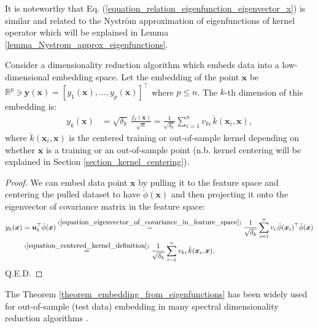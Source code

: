 \documentclass[lang=cn,10pt]{gorgeousnbook}
\numberwithin{equation}{section}%
\numberwithin{figure}{section}%
\begin{document}
It is noteworthy that Eq. (\ref{equation_relation_eigenfunction_eigenvector_x}) is similar and related to the Nystr{\"o}m approximation of eigenfunctions of kernel operator which will be explained in Lemma \ref{lemma_Nystrom_approx_eigenfunctions}.



\begin{theorem}\label{theorem_embedding_from_eigenfunctions}
Consider a dimensionality reduction algorithm which embeds data into a low-dimensional embedding space.
Let the embedding of the point $\boldsymbol{x}$ be $\mathbb{R}^p \ni \boldsymbol{y}(\boldsymbol{x}) = [y_1(\boldsymbol{x}), \dots, y_p(\boldsymbol{x})]^\top$ where $p \leq n$. The $k$-th dimension of this embedding is:
\begin{align}\label{equation_embedding_eigenfunction}
y_k(\boldsymbol{x}) &= \sqrt{\delta_k}\, \frac{f_k(\boldsymbol{x})}{\sqrt{n}} = \frac{1}{\sqrt{\delta_k}} \sum_{i=1}^n v_{ki}\, \breve{k}(\boldsymbol{x}_i, \boldsymbol{x}),
\end{align}
where $\breve{k}(\boldsymbol{x}_i, \boldsymbol{x})$ is the centered training or out-of-sample kernel depending on whether $\boldsymbol{x}$ is a training or an out-of-sample point (n.b. kernel centering will be explained in Section \ref{section_kernel_centering}). 
\end{theorem}
\begin{proof}
We can embed data point $\boldsymbol{x}$ by pulling it to the feature space and centering the pulled dataset to have $\breve{\phi}(\boldsymbol{x})$ and then projecting it onto the eigenvector of covariance matrix in the feature space:
\begin{align*}
y_k(\boldsymbol{x}) &= \boldsymbol{u}_k^\top \breve{\phi}(\boldsymbol{x}) \overset{(\ref{equation_eigenvector_of_covariance_in_feature_space})}{=} \frac{1}{\sqrt{\delta_k}} \sum_{i=1}^n v_i\, \breve{\phi}(\boldsymbol{x}_i)^\top \breve{\phi}(\boldsymbol{x}) \\
&\overset{(\ref{equation_centered_kernel_definition})}{=} \frac{1}{\sqrt{\delta_k}} \sum_{i=1}^n v_{ki}\, \breve{k}(\boldsymbol{x}_i, \boldsymbol{x}).
\end{align*}
Q.E.D.
\end{proof}
The Theorem \ref{theorem_embedding_from_eigenfunctions} has been widely used for out-of-sample (test data) embedding in many spectral dimensionality reduction algorithms \cite{bengio2003out}.
\end{document}
